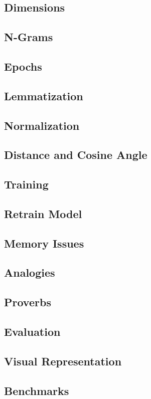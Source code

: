 \subsection{Dimensions}
\subsection{N-Grams}
\subsection{Epochs}
\subsection{Lemmatization}
\subsection{Normalization}
\subsection{Distance and Cosine Angle}
\subsection{Training}
\subsection{Retrain Model}
\subsection{Memory Issues}
\subsection{Analogies}
\subsection{Proverbs}
\subsection{Evaluation}
\subsection{Visual Representation}
\subsection{Benchmarks}
